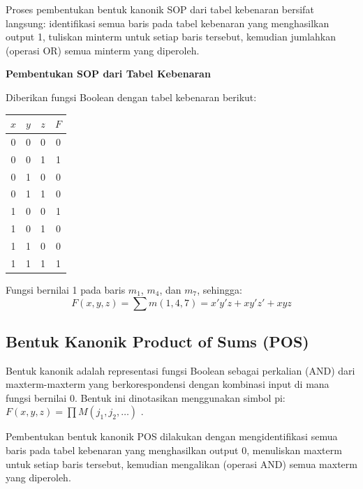 Proses pembentukan bentuk kanonik SOP dari tabel kebenaran bersifat langsung: identifikasi semua baris pada tabel kebenaran yang menghasilkan output 1, tuliskan minterm untuk setiap baris tersebut, kemudian jumlahkan (operasi OR) semua minterm yang diperoleh.

\begin{contoh}
\textbf{Pembentukan SOP dari Tabel Kebenaran}

Diberikan fungsi Boolean dengan tabel kebenaran berikut:

\begin{center}
\begin{tabular}{|c|c|c||c|}
\hline
$x$ & $y$ & $z$ & $F$ \\ \hline
0 & 0 & 0 & 0 \\ \hline
0 & 0 & 1 & 1 \\ \hline
0 & 1 & 0 & 0 \\ \hline
0 & 1 & 1 & 0 \\ \hline
1 & 0 & 0 & 1 \\ \hline
1 & 0 & 1 & 0 \\ \hline
1 & 1 & 0 & 0 \\ \hline
1 & 1 & 1 & 1 \\ \hline
\end{tabular}
\end{center}

Fungsi bernilai 1 pada baris $m_1$, $m_4$, dan $m_7$, sehingga:
\[ F(x,y,z) = \sum m(1, 4, 7) = x'y'z + xy'z' + xyz \]
\end{contoh}

\subsection{Bentuk Kanonik Product of Sums (POS)}

\begin{definisi}
Bentuk kanonik  adalah representasi fungsi Boolean sebagai perkalian (AND) dari maxterm-maxterm yang berkorespondensi dengan kombinasi input di mana fungsi bernilai 0. Bentuk ini dinotasikan menggunakan simbol pi: $F(x, y, z) = \prod M(j_1, j_2, \ldots)$ \cite{geeksforgeeks_sop_pos}.
\end{definisi}

Pembentukan bentuk kanonik POS dilakukan dengan mengidentifikasi semua baris pada tabel kebenaran yang menghasilkan output 0, menuliskan maxterm untuk setiap baris tersebut, kemudian mengalikan (operasi AND) semua maxterm yang diperoleh.

